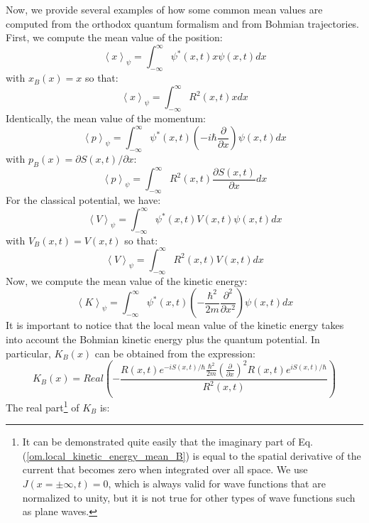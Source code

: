 \documentclass[nofootinbib, secnumarabic, amsmath, nobibnotes,11pt,aps,pra, floatfix]{revtex4-1}
\newcommand{\eref}[1]{Eq. (\ref{#1})}
\newcommand{\avg}[1]{\left\langle #1 \right\rangle} %
\begin{document}
Now, we provide several examples of how some common mean values are
computed from the orthodox quantum formalism and from Bohmian
trajectories. First, we compute the mean value of the position:
\begin{equation}
\label{om.position_mean_0}
\avg{x}_{\psi} = \int_{-\infty}^{\infty} \psi^{*}(x,t) x \psi(x,t) dx
\end{equation}
with $x_B(x) = x$ so that:
\begin{equation}
\label{om.position_mean_B}
\avg{x}_{\psi} = \int_{-\infty}^{\infty} R^2(x,t) x dx
\end{equation}
Identically, the mean value of the momentum:
\begin{equation}
\label{om.momentum_mean_0}
\avg{p}_{\psi} = \int_{-\infty}^{\infty} \psi^{*}(x,t) \left(-i\hbar \frac {\partial} {\partial x}\right) \psi(x,t) dx
\end{equation}
with $p_B(x) = {\partial S(x,t)}/{\partial x}$:
\begin{equation}
\label{om.momentum_mean_B}
\avg{p}_{\psi} = \int_{-\infty}^{\infty} R^2(x,t) \frac {\partial S(x,t)} {\partial x} dx
\end{equation}
For the classical potential, we have:
\begin{equation}
\label{om.Potential_energy_mean_0}
\avg{V}_{\psi} = \int_{-\infty}^{\infty} \psi^{*}(x,t) V(x,t) \psi(x,t) dx
\end{equation}
with $V_B(x,t) = V(x,t)$ so that:
\begin{equation}
\label{om.Potential_energy_mean_B}
\avg{V}_{\psi} = \int_{-\infty}^{\infty} R^2(x,t) V(x,t) dx
\end{equation}
Now, we compute the mean value of the kinetic energy:
\begin{equation}
\label{om.kinetic_energy_mean_0}
\avg{K}_{\psi} = \int_{-\infty}^{\infty} \psi^{*}(x,t) \left(-\frac {\hbar^2} {2m} \frac {\partial^2} {\partial x^2}\right) \psi(x,t) dx
\end{equation}
It is important to notice that the local mean value of the kinetic
energy takes into account the Bohmian kinetic energy plus the
quantum potential. In particular, $K_B(x)$ can be obtained from the
expression:
\begin{equation}
\label{om.local_kinetic_energy_mean_B}
K_B(x) = Real \left( -\frac {R(x,t) e^{-iS(x,t)/\hbar} \frac{\hbar^2} {2m} \left( \frac {\partial} {\partial x} \right)^2 R(x,t) e^{iS(x,t)/\hbar}} {R^2(x,t)} \right)
\end{equation}
The real part\footnote{It can be demonstrated quite easily that the imaginary part of \eref{om.local_kinetic_energy_mean_B} is equal to the spatial derivative of the current that becomes zero when integrated over all space. We use $J(x = \pm\infty,t) = 0$, which is always valid for wave functions that are normalized to unity, but it is not true for other types of wave functions such as plane waves.} of $K_B$ is:
\end{document}
